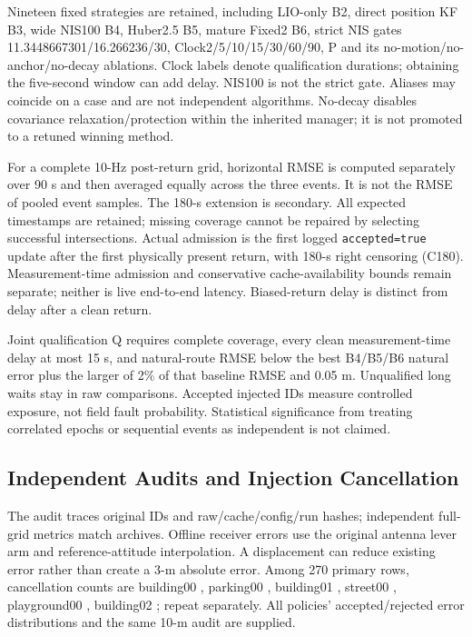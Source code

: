 \documentclass[conference]{IEEEtran}
\begin{document}
Nineteen fixed strategies are retained, including LIO-only B2, direct position KF B3, wide NIS100 B4, Huber2.5 B5, mature Fixed2 B6, strict NIS gates 11.3448667301/16.266236/30, Clock2/5/10/15/30/60/90, P and its no-motion/no-anchor/no-decay ablations. Clock labels denote qualification durations; obtaining the five-second window can add delay. NIS100 is not the strict gate. Aliases may coincide on a case and are not independent algorithms. No-decay disables covariance relaxation/protection within the inherited manager; it is not promoted to a retuned winning method.

For a complete 10-Hz post-return grid, horizontal RMSE is computed separately over 90 s and then averaged equally across the three events. It is not the RMSE of pooled event samples. The 180-s extension is secondary. All expected timestamps are retained; missing coverage cannot be repaired by selecting successful intersections. Actual admission is the first logged \texttt{accepted=true} update after the first physically present return, with 180-s right censoring (C180). Measurement-time admission and conservative cache-availability bounds remain separate; neither is live end-to-end latency. Biased-return delay is distinct from delay after a clean return.

Joint qualification Q requires complete coverage, every clean measurement-time delay at most 15 s, and natural-route RMSE below the best B4/B5/B6 natural error plus the larger of 2\% of that baseline RMSE and 0.05 m. Unqualified long waits stay in raw comparisons. Accepted injected IDs measure controlled exposure, not field fault probability. Statistical significance from treating correlated epochs or sequential events as independent is not claimed.

\subsection{Independent Audits and Injection Cancellation}
The audit traces original IDs and raw/cache/config/run hashes; independent full-grid metrics match archives. Offline receiver errors use the original antenna lever arm and reference-attitude interpolation. A displacement can reduce existing error rather than create a 3-m absolute error. Among 270 primary rows, cancellation counts are building00 , parking00 , building01 , street00 , playground00 , building02 ; repeat  separately. All policies' accepted/rejected error distributions and the same 10-m audit are supplied.
\end{document}
